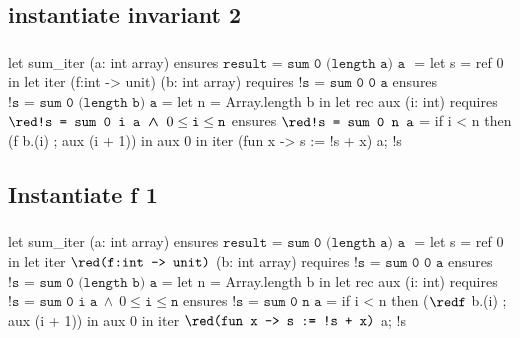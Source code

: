 \documentclass[xcolor=dvipsnames]{beamer}
\newcommand{\bwedge}{\boldsymbol{~\wedge~}}
\begin{document}
\subsection*{instantiate invariant 2}
\begin{frame}[fragile]
\frametitle{}
\vspace*{0em}
\begin{footnotesize}
\begin{whycode}
let sum_iter (a: int array) 
ensures { $\texttt{result = sum 0 (length a) a }$}
= let s = ref 0 in 
  let iter (f:int -> unit) (b: int array)
  requires { ${ \texttt{!s = sum 0 0 a}}$ } 
  ensures  { ${ \texttt{!s = sum 0 (length b) a}}$ } 
  = let n = Array.length b in
    let rec aux (i: int)
    requires { ${\red\texttt{!s = sum 0 i a}\bwedge 0 \leq \texttt{i} \leq \texttt{n}}$ }
    ensures  { ${\red\texttt{!s = sum 0 n a}}$ }
    = if i < n
      then (f b.(i) ; aux (i + 1)) 
    in aux 0
  in iter (fun x -> s := !s + x) a; 
  !s
\end{whycode}
\end{footnotesize}
\end{frame}
\addtocounter{framenumber}{-1}



\subsection*{Instantiate f 1}
\begin{frame}[fragile]
\frametitle{}
\vspace*{0em}
\begin{footnotesize}
\begin{whycode}
let sum_iter (a: int array) 
ensures { $\texttt{result = sum 0 (length a) a }$}
= let s = ref 0 in 
  let iter ${\red\texttt{(f:int -> unit)}}$ (b: int array)
  requires { ${ \texttt{!s = sum 0 0 a}}$ } 
  ensures  { ${ \texttt{!s = sum 0 (length b) a}}$ } 
  = let n = Array.length b in
    let rec aux (i: int)
    requires { ${\texttt{!s = sum 0 i a}\bwedge 0 \leq \texttt{i} \leq \texttt{n}}$ }
    ensures  { ${\texttt{!s = sum 0 n a}}$ }
    = if i < n
      then (${\red\texttt{f}}$ b.(i) ; aux (i + 1)) 
    in aux 0
  in iter ${\red\texttt{(fun x -> s := !s + x)}}$ a; 
  !s
\end{whycode}
\end{footnotesize}
\end{frame}
\addtocounter{framenumber}{-1}


\end{document}
